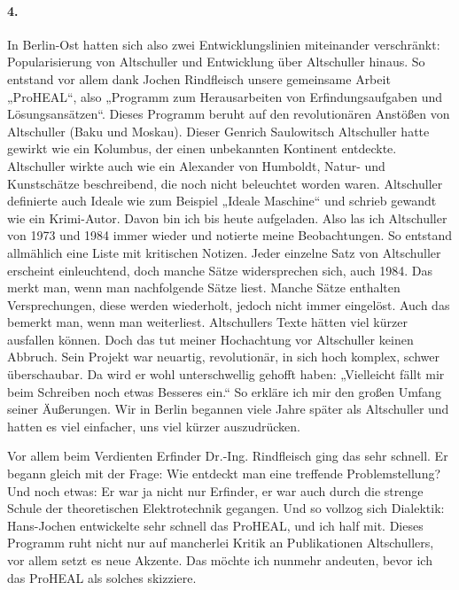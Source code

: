 \documentclass[12pt,a4paper]{article}
\begin{document}
\paragraph{4.}
In Berlin-Ost hatten sich also zwei Entwicklungslinien miteinander
verschränkt: Popularisierung von Altschuller und Entwicklung über Altschuller
hinaus. So entstand vor allem dank Jochen Rindfleisch unsere gemeinsame Arbeit
„ProHEAL“, also „Programm zum Herausarbeiten von Erfindungsaufgaben und
Lösungsansätzen“. Dieses Programm beruht auf den revolutionären Anstößen von
Altschuller (Baku und Moskau). Dieser Genrich Saulowitsch Altschuller hatte
gewirkt wie ein Kolumbus, der einen unbekannten Kontinent entdeckte.
Altschuller wirkte auch wie ein Alexander von Humboldt, Natur- und
Kunstschätze beschreibend, die noch nicht beleuchtet worden waren. Altschuller
definierte auch Ideale wie zum Beispiel „Ideale Maschine“ und schrieb gewandt
wie ein Krimi-Autor. Davon bin ich bis heute aufgeladen. Also las ich
Altschuller von 1973 und 1984 immer wieder und notierte meine Beobachtungen.
So entstand allmählich eine Liste mit kritischen Notizen. Jeder einzelne Satz
von Altschuller erscheint einleuchtend, doch manche Sätze widersprechen sich,
auch 1984. Das merkt man, wenn man nachfolgende Sätze liest. Manche Sätze
enthalten Versprechungen, diese werden wiederholt, jedoch nicht immer
eingelöst. Auch das bemerkt man, wenn man weiterliest. Altschullers Texte
hätten viel kürzer ausfallen können. Doch das tut meiner Hochachtung vor
Altschuller keinen Abbruch. Sein Projekt war neuartig, revolutionär, in sich
hoch komplex, schwer überschaubar. Da wird er wohl unterschwellig gehofft
haben: „Vielleicht fällt mir beim Schreiben noch etwas Besseres ein.“ So
erkläre ich mir den großen Umfang seiner Äußerungen. Wir in Berlin begannen
viele Jahre später als Altschuller und hatten es viel einfacher, uns viel
kürzer auszudrücken.

Vor allem beim Verdienten Erfinder Dr.-Ing. Rindfleisch ging das sehr schnell.
Er begann gleich mit der Frage: Wie entdeckt man eine treffende
Problemstellung?  Und noch etwas: Er war ja nicht nur Erfinder, er war auch
durch die strenge Schule der theoretischen Elektrotechnik gegangen. Und so
vollzog sich Dialektik: Hans-Jochen entwickelte sehr schnell das ProHEAL, und
ich half mit. Dieses Programm ruht nicht nur auf mancherlei Kritik an
Publikationen Altschullers, vor allem setzt es neue Akzente. Das möchte ich
nunmehr andeuten, bevor ich das ProHEAL als solches skizziere.
\end{document}

